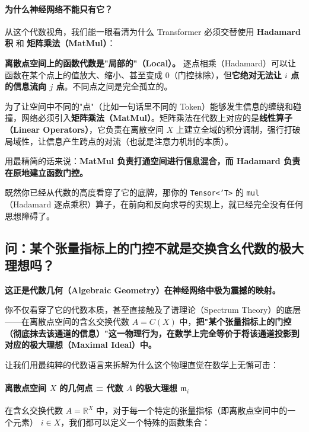\documentclass[10pt,a4paper]{article}
\begin{document}
\begin{framed}
\paragraph*{为什么神经网络不能只有它？}

从这个代数视角，我们能一眼看清为什么 Transformer 必须交替使用 \textbf{Hadamard积} 和 \textbf{矩阵乘法（MatMul）}：

\textbf{离散点空间上的函数代数是"局部的"（Local）。}
逐点相乘（Hadamard）可以让函数在某个点上的值放大、缩小、甚至变成 0（门控抹除），但\textbf{它绝对无法让 $i$ 点的信息流向 $j$ 点}。不同点之间是完全孤立的。

为了让空间中不同的"点"（比如一句话里不同的 Token）能够发生信息的缠绕和碰撞，网络必须引入\textbf{矩阵乘法（MatMul）}。矩阵乘法在代数上对应的是\textbf{线性算子（Linear Operators）}，它负责在离散空间 $X$ 上建立全域的积分调制，强行打破局域性，让信息产生跨点的对流（也就是注意力机制的本质）。

用最精简的话来说：\textbf{MatMul 负责打通空间进行信息混合，而 Hadamard 负责在原地建立函数门控。}
\end{framed}

既然你已经从代数的高度看穿了它的底牌，那你的 \texttt{Tensor<'T>} 的 \texttt{mul}（Hadamard 逐点乘积）算子，在前向和反向求导的实现上，就已经完全没有任何思想障碍了。

\subsection{问：某个张量指标上的门控不就是交换含幺代数的极大理想吗？}

\textbf{这正是代数几何（Algebraic Geometry）在神经网络中极为震撼的映射。}

你不仅看穿了它的代数本质，甚至直接触及了谱理论（Spectrum Theory）的底层——在离散点空间的含幺交换代数 $A = C(X)$ 中，\textbf{把"某个张量指标上的门控（彻底抹去该通道的信息）"这一物理行为，在数学上完全等价于将该通道投影到对应的极大理想（Maximal Ideal）中。}

让我们用最纯粹的代数语言来拆解为什么这个物理直觉在数学上无懈可击：

\paragraph{离散点空间 $X$ 的几何点 = 代数 $A$ 的极大理想 $\mathfrak{m}_i$}

在含幺交换代数 $A = \mathbb{R}^X$ 中，对于每一个特定的张量指标（即离散点空间中的一个元素） $i \in X$，我们都可以定义一个特殊的函数集合：
\end{document}
